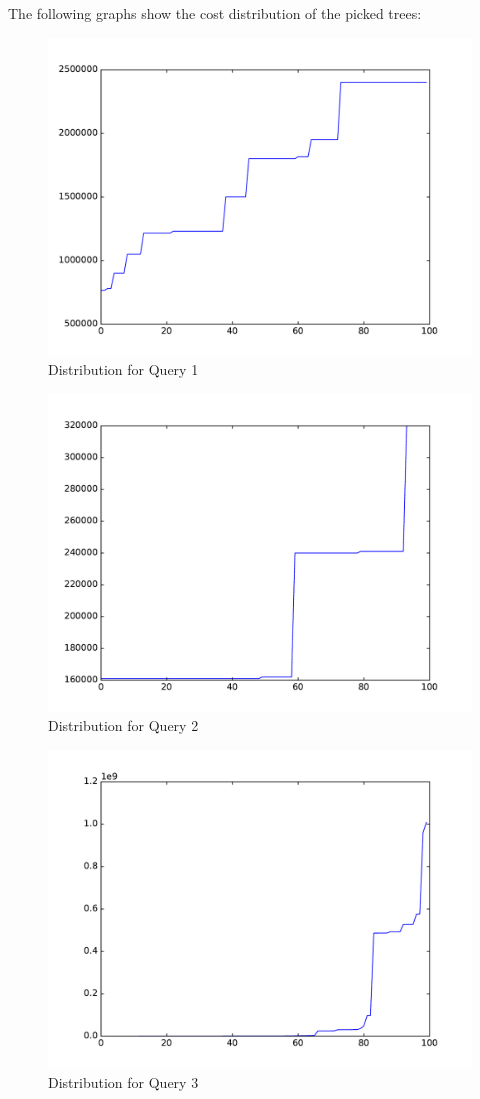 \documentclass{scrartcl}
\begin{document}
The following graphs show the cost distribution of the picked trees:

\begin{figure}[H]
    \centering
    \includegraphics[scale=0.8]{plot-q1}
    \caption{Distribution for Query 1}
\end{figure}

\begin{figure}[H]
    \centering
    \includegraphics[scale=0.8]{plot-q2}
    \caption{Distribution for Query 2}
\end{figure}

\begin{figure}[H]
    \centering
    \includegraphics[scale=0.8]{plot-q3}
    \caption{Distribution for Query 3}
\end{figure}
\end{document}
